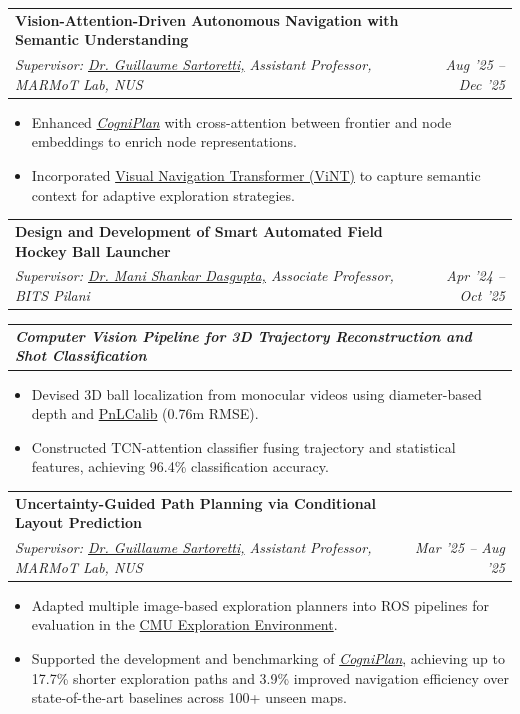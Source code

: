\documentclass[letterpaper,10pt]{article}
\makeatletter
\newcommand{\resumeItem}[1]{
  \item \small{#1\vspace{-2pt}}
}
\newcommand{\resumeSubheading}[4]{
  \vspace{0pt}\item
  \begin{tabular*}{0.97\textwidth}[t]{l@{\extracolsep{\fill}}r}
    \textbf{#1} & \textbf{#2} \\
    \textit{\small #3} & \textit{\small #4} \\
  \end{tabular*}\vspace{-6pt}
}
\newcommand{\resumeSubSubheading}[2]{
  \vspace{0pt}\item
  \begin{tabular*}{0.97\textwidth}[t]{l@{\extracolsep{\fill}}r}
    \textit{\small #1} & \textit{\small #2} \\
  \end{tabular*}\vspace{-6pt}
}
\newcommand{\resumeItemListStart}{
  \begin{itemize}[leftmargin=0.18in]
}
\newcommand{\resumeItemListEnd}{
  \end{itemize}\vspace{-6pt}
}
\makeatother
\begin{document}
  \resumeSubheading
    {Vision-Attention-Driven Autonomous Navigation with Semantic Understanding}{}
    {Supervisor: {\color{blue}\href{https://cde.nus.edu.sg/me/staff/sartoretti-guillaume-a/}{Dr. Guillaume Sartoretti,}} Assistant Professor, MARMoT Lab, NUS}{Aug '25 – Dec '25}
  \resumeItemListStart
    \resumeItem{Enhanced \textit{\color{blue}\href{https://yizhuo-wang.com/cogniplan/}{CogniPlan}} with cross-attention between frontier and node embeddings to enrich node representations.}
    \resumeItem{Incorporated {\color{blue}\href{https://general-navigation-models.github.io/vint/}{Visual Navigation Transformer (ViNT)}} to capture semantic context for adaptive exploration strategies.}
  \resumeItemListEnd

  \resumeSubheading
    {Design and Development of Smart Automated Field Hockey Ball Launcher \color{blue}\href{https://drive.google.com/file/d/1h7X9fIiih37ivgERVR-wbWsDEil0qvpI/view?usp=drive_link}{\faExternalLink*}}{}
    {Supervisor: {\color{blue}\href{https://www.bits-pilani.ac.in/pilani/m-s-dasgupta/}{Dr. Mani Shankar Dasgupta,}} Associate Professor, BITS Pilani}{Apr '24 – Oct '25}

    \resumeSubSubheading
      {\textbf{\hspace{4pt}Computer Vision Pipeline for 3D Trajectory Reconstruction and Shot Classification}}{}
    \resumeItemListStart
      \resumeItem{Devised 3D ball localization from monocular videos using diameter-based depth and {\color{blue}\href{https://github.com/mguti97/PnLCalib}{PnLCalib}}  (0.76m RMSE).}
      \resumeItem{Constructed TCN-attention classifier fusing trajectory and statistical features, achieving 96.4\% classification accuracy.}
    \resumeItemListEnd

  \resumeSubheading
    {Uncertainty-Guided Path Planning via Conditional Layout Prediction \color{blue}\href{https://yizhuo-wang.com/cogniplan/}{\faExternalLink*}}{}
    {Supervisor: {\color{blue}\href{https://cde.nus.edu.sg/me/staff/sartoretti-guillaume-a/}{Dr. Guillaume Sartoretti,}} Assistant Professor, MARMoT Lab, NUS}{Mar '25 – Aug '25}
  \resumeItemListStart
    \resumeItem{Adapted multiple image-based exploration planners into ROS pipelines for evaluation in the \color{blue}\href{https://www.cmu-exploration.com/}{CMU Exploration Environment}.}
    \resumeItem{Supported the development and benchmarking of \textit{\color{blue}\href{https://yizhuo-wang.com/cogniplan/}{CogniPlan}}, achieving up to 17.7\% shorter exploration paths and 3.9\% improved navigation efficiency over state-of-the-art baselines across 100+ unseen maps.}
  \resumeItemListEnd
\end{document}
